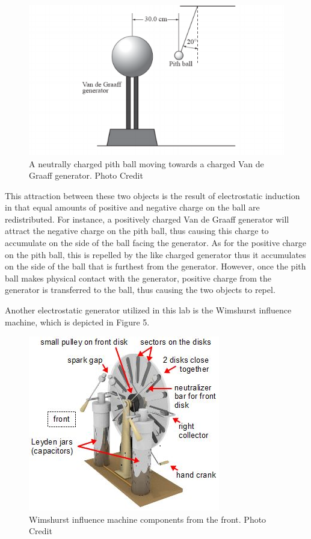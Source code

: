 \documentclass[oneside,12pt]{amsart}
\begin{document}
\begin{figure}[h]
	\includegraphics[width=\smallgraph,scale=0.01]{Pith.png}
	\caption{A neutrally charged pith ball moving towards a charged Van de Graaff generator. Photo Credit \cite{dickie}}
	\label{Pith}
\end{figure} 

\indent This attraction between these two objects is the result of electrostatic induction in that equal amounts of positive and negative charge on the ball are redistributed. For instance, a positively charged Van de Graaff generator will attract the negative charge on the pith ball, thus causing this charge to accumulate on the side of the ball facing the generator. As for the positive charge on the pith ball, this is repelled by the like charged generator thus it accumulates on the side of the ball that is furthest from the generator. However, once the pith ball makes physical contact with the generator, positive charge from the generator is transferred to the ball, thus causing the two objects to repel. 

Another electrostatic generator utilized in this lab is the Wimshurst influence machine, which is depicted in Figure 5. \\
\begin{figure}[h]
	\includegraphics[width=\smallgraph,scale=0.01]{Wim.png}
	\caption{Wimshurst influence machine components from the front. Photo Credit \cite{Wim}}
	\label{Wim}
\end{figure} 
\end{document}
